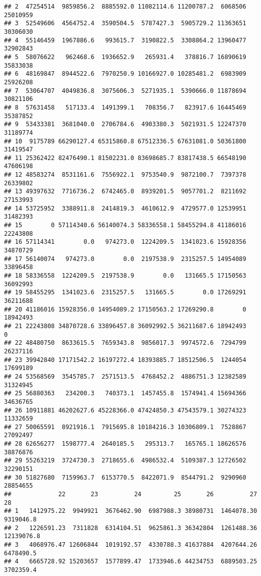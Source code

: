 \documentclass[
]{article}
\begin{document}
\begin{verbatim}
## 2  47254514  9859856.2  8885592.0 11082114.6 11200787.2  6068506 25010959
## 3  52549606  4564752.4  3590504.5  5787427.3  5905729.2 11363651 30306030
## 4  55146459  1967886.6   993615.7  3190822.5  3308864.2 13960477 32902843
## 5  58076622   962468.6  1936652.9   265931.4   378816.7 16890619 35833038
## 6  48169847  8944522.6  7970250.9 10166927.0 10285481.2  6983909 25926208
## 7  53064707  4049836.8  3075606.3  5271935.1  5390666.0 11878694 30821106
## 8  57631458   517133.4  1491399.1   708356.7   823917.6 16445469 35387852
## 9  53433381  3681040.0  2706784.6  4903380.3  5021931.5 12247370 31189774
## 10  9175789 66290127.4 65315860.8 67512336.5 67631081.0 50361800 31419547
## 11 25362422 82476490.1 81502231.0 83698685.7 83817438.5 66548190 47606198
## 12 48583274  8531161.6  7556922.1  9753540.9  9872100.7  7397378 26339802
## 13 49397632  7716736.2  6742465.0  8939201.5  9057701.2  8211692 27153993
## 14 53725952  3388911.8  2414819.3  4610612.9  4729577.0 12539951 31482393
## 15        0 57114340.6 56140074.3 58336558.1 58455294.8 41186016 22243808
## 16 57114341        0.0   974273.0  1224209.5  1341023.6 15928356 34870729
## 17 56140074   974273.0        0.0  2197538.9  2315257.5 14954089 33896458
## 18 58336558  1224209.5  2197538.9        0.0   131665.5 17150563 36092993
## 19 58455295  1341023.6  2315257.5   131665.5        0.0 17269291 36211688
## 20 41186016 15928356.0 14954089.2 17150563.2 17269290.8        0 18942493
## 21 22243808 34870728.6 33896457.8 36092992.5 36211687.6 18942493        0
## 22 48480750  8633615.5  7659343.8  9856017.3  9974572.6  7294799 26237116
## 23 39942840 17171542.2 16197272.4 18393885.7 18512506.5  1244054 17699189
## 24 53568569  3545785.7  2571513.5  4768452.2  4886751.3 12382589 31324945
## 25 56880363   234200.3   740373.1  1457455.8  1574941.4 15694366 34636765
## 26 10911881 46202627.6 45228366.0 47424850.3 47543579.1 30274323 11332659
## 27 50065591  8921916.1  7915695.8 10184216.3 10306809.1  7528867 27092497
## 28 62656277  1598777.4  2640185.5   295313.7   165765.1 18626576 38876876
## 29 55263219  3724730.3  2718655.6  4986532.4  5109387.3 12726502 32290151
## 30 51827680  7159963.7  6153770.5  8422071.9  8544791.2  9290960 28854655
##             22       23          24         25       26          27         28
## 1   1412975.22  9949921  3676462.90  6987988.3 38980731  1464078.30  9319046.8
## 2   1226591.23  7311828  6314104.51  9625861.3 36342804  1261488.36 12139076.8
## 3   4068976.47 12606844  1019192.57  4330788.3 41637884  4207644.26  6478490.5
## 4   6665728.92 15203657  1577899.47  1733946.6 44234753  6889503.25  3702359.4

\end{verbatim}
\end{document}
